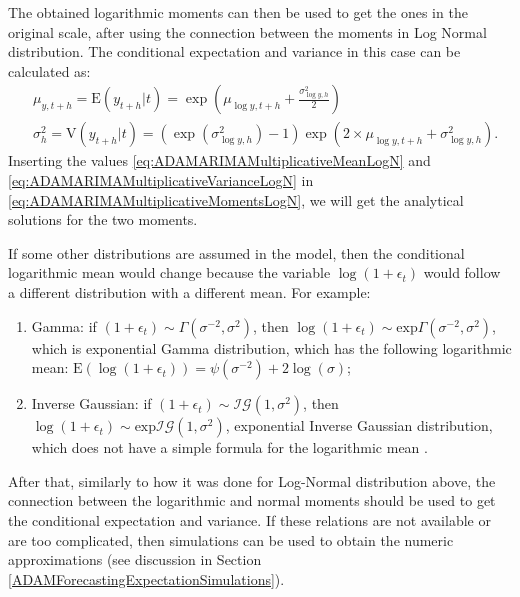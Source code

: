 \documentclass[
]{book}
\providecommand{\tightlist}{%
  \setlength{\itemsep}{0pt}\setlength{\parskip}{0pt}}
\theoremstyle{definition}
\theoremstyle{definition}
\theoremstyle{definition}
\theoremstyle{definition}
\theoremstyle{remark}
\begin{document}
The obtained logarithmic moments can then be used to get the ones in the original scale, after using the connection between the moments in Log Normal distribution. The conditional expectation and variance in this case can be calculated as:
\begin{equation}
  \begin{aligned}
    & \mu_{y,t+h} = \mathrm{E}(y_{t+h}|t) = \exp \left(\mu_{\log y,t+h} + \frac{\sigma^2_{\log y,h}}{2} \right) \\
    & \sigma^2_{h} = \mathrm{V}(y_{t+h}|t) = \left(\exp\left( \sigma^2_{\log y,h} \right) -1 \right)\exp\left(2 \times \mu_{\log y,t+h} + \sigma^2_{\log y,h} \right) .
  \end{aligned}
  \label{eq:ADAMARIMAMultiplicativeMomentsLogN}
\end{equation}
Inserting the values \eqref{eq:ADAMARIMAMultiplicativeMeanLogN} and \eqref{eq:ADAMARIMAMultiplicativeVarianceLogN} in \eqref{eq:ADAMARIMAMultiplicativeMomentsLogN}, we will get the analytical solutions for the two moments.

If some other distributions are assumed in the model, then the conditional logarithmic mean would change because the variable \(\log(1+\epsilon_t)\) would follow a different distribution with a different mean. For example:

\begin{enumerate}
\def\labelenumi{\arabic{enumi}.}
\tightlist
\item
  Gamma: if \(\left(1+\epsilon_t \right) \sim \mathcal{\Gamma}(\sigma^{-2}, \sigma^2)\), then \(\log\left(1+\epsilon_t \right) \sim \mathrm{exp}\mathcal{\Gamma}(\sigma^{-2}, \sigma^2)\), which is exponential Gamma distribution, which has the following logarithmic mean: \(\mathrm{E}(\log(1+\epsilon_t)) = \psi\left(\sigma^{-2}\right)+2\log(\sigma)\);
\item
  Inverse Gaussian: if \(\left(1+\epsilon_t \right) \sim \mathcal{IG}(1, \sigma^2)\), then \(\log\left(1+\epsilon_t \right) \sim \mathrm{exp}\mathcal{IG}(1, \sigma^2)\), exponential Inverse Gaussian distribution, which does not have a simple formula for the logarithmic mean \citep[but it can be calculated based on its connection with Generalised \(\mathcal{IG}\) and formulae provided in][]{Sichel1997}.
\end{enumerate}

After that, similarly to how it was done for Log-Normal distribution above, the connection between the logarithmic and normal moments should be used to get the conditional expectation and variance. If these relations are not available or are too complicated, then simulations can be used to obtain the numeric approximations (see discussion in Section \ref{ADAMForecastingExpectationSimulations}).
\end{document}
